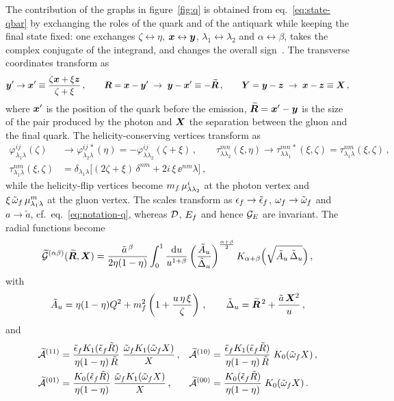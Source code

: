 The contribution of the graphs in figure~\ref{fig:q} is obtained from eq.~\eqref{eq:state-qbar} by
exchanging the roles of the quark and of the antiquark while keeping the final state fixed: one
exchanges $\zeta\leftrightarrow\eta$, $\bm{x}\leftrightarrow\bm{y}$, $\lambda_1\leftrightarrow\lambda_2$ and
$\alpha\leftrightarrow\beta$, takes the complex conjugate of the integrand, and changes the overall
sign~\cite{Iancu:2022gpw}. The transverse coordinates transform as
\begin{equation}
\bm{y}'\to\bm{x}'\equiv\frac{\zeta\bm{x}+\xi\bm{z}}{\zeta+\xi}\,,\qquad
\bm{R}=\bm{x}-\bm{y}'\;\to\;\bm{y}-\bm{x}'\equiv-\widetilde{\bm{R}}\,,\qquad\bm{Y}=\bm{y}-\bm{z}\;\to\;\bm{x}-\bm{z}\equiv\bm{X}\,,
\label{eq:coords-q}
\end{equation}
where $\bm{x}'$ is the position of the quark before the emission, $\widetilde{\bm{R}}=\bm{x}'-\bm{y}$ is the size of the pair
produced by the photon and $\bm{X}$ the separation between the gluon and the final quark. The
helicity-conserving vertices transform as
\begin{align}
\varphi^{ij}_{\lambda_1\lambda}(\zeta)&\to\varphi^{ij\,*}_{\lambda_2\lambda}(\eta)
=-\varphi^{ij}_{\lambda\lambda_2}(\zeta+\xi)\,,\qquad
\tau^{mn}_{\lambda\lambda_2}(\xi,\eta)\to\tau^{mn\,*}_{\lambda\lambda_1}(\xi,\zeta)
=\tau^{nm}_{\lambda_1\lambda}(\xi,\zeta)\,,
\nonumber\\
\tau^{nm}_{\lambda_1\lambda}(\xi,\zeta)&=\delta_{\lambda_1\lambda}\big[(2\zeta+\xi)\,\delta^{nm}
+2i\,\xi\,\ee^{nm}\lambda\big]\,,
\label{eq:vert-q}
\end{align}
while the helicity-flip vertices become $m_f\,\mu^i_{\lambda\lambda_2}$ at the photon vertex and
$\xi\,\tilde{\omega}_f\,\mu^m_{\lambda_1\lambda}$ at the gluon vertex. The scales transform as
$\epsilon_f\to\tilde{\epsilon}_f$, $\omega_f\to\tilde{\omega}_f$ and $a\to\tilde a$, cf.\ eq.~\eqref{eq:notation-q}, whereas $\mathcal{D}$, $E_f$ and
hence $\mathcal{G}_E$ are invariant. The radial functions become
\begin{equation}
\widetilde{\mathcal{G}}^{(\alpha\beta)}(\widetilde{\bm{R}},\bm{X})=\frac{\tilde a^{\,\beta}}{2\eta(1-\eta)}\int_0^1\frac{{\rm d} u}{u^{1+\beta}}
\left(\frac{\tilde A_u}{\tilde\Delta_u}\right)^{\frac{\alpha+\beta}{2}}
K_{\alpha+\beta}\Big(\sqrt{\tilde A_u\,\tilde\Delta_u}\Big)\,,
\label{eq:Gtab}
\end{equation}
with
\begin{equation}
\tilde A_u=\eta(1-\eta)Q^2+m_f^2\left(1+\frac{u\,\eta\,\xi}{\zeta}\right)\,,\qquad
\tilde\Delta_u=\widetilde{\bm{R}}^{\,2}+\frac{\tilde a\,\bm{X}^2}{u}\,,
\end{equation}
and
\begin{align}
\widetilde{\mathcal{A}}^{(11)}&=\frac{\tilde{\epsilon}_f K_1(\tilde{\epsilon}_f\tilde R)}{\eta(1-\eta)\,\tilde R}\;\frac{\tilde{\omega}_f K_1(\tilde{\omega}_f X)}{X}\,,
&\widetilde{\mathcal{A}}^{(10)}&=\frac{\tilde{\epsilon}_f K_1(\tilde{\epsilon}_f\tilde R)}{\eta(1-\eta)\,\tilde R}\;K_0(\tilde{\omega}_f X)\,,
\nonumber\\
\widetilde{\mathcal{A}}^{(01)}&=\frac{K_0(\tilde{\epsilon}_f\tilde R)}{\eta(1-\eta)}\;\frac{\tilde{\omega}_f K_1(\tilde{\omega}_f X)}{X}\,,
&\widetilde{\mathcal{A}}^{(00)}&=\frac{K_0(\tilde{\epsilon}_f\tilde R)}{\eta(1-\eta)}\;K_0(\tilde{\omega}_f X)\,.
\label{eq:Atexplicit}
\end{align}
